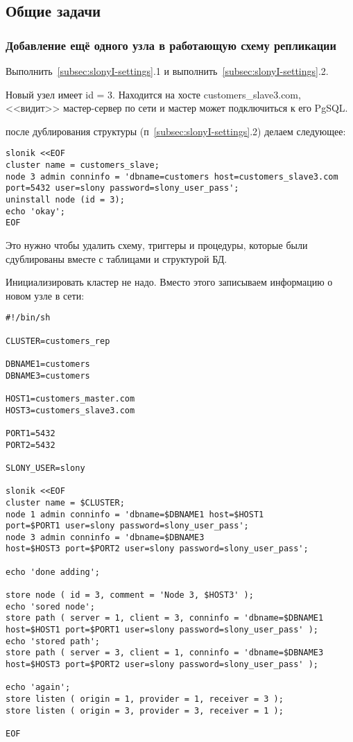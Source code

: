 \subsection{Общие задачи}
\subsubsection{Добавление ещё одного узла в работающую схему репликации}
Выполнить~\ref{subsec:slonyI-settings}.1 и выполнить~\ref{subsec:slonyI-settings}.2.

Новый узел имеет id = 3. Находится на хосте customers\_slave3.com, <<видит>> мастер-сервер по сети и
мастер может подключиться к его PgSQL.

после дублирования структуры (п~\ref{subsec:slonyI-settings}.2) делаем следующее:
\begin{lstlisting}[label=lst:slony13,caption=Общие задачи]
slonik <<EOF
cluster name = customers_slave;
node 3 admin conninfo = 'dbname=customers host=customers_slave3.com
port=5432 user=slony password=slony_user_pass';
uninstall node (id = 3);
echo 'okay';
EOF
\end{lstlisting}

Это нужно чтобы удалить схему, триггеры и процедуры, которые были сдублированы вместе с таблицами и структурой БД.

Инициализировать кластер не надо. Вместо этого записываем информацию о новом узле в сети:
\begin{lstlisting}[label=lst:slony14,caption=Общие задачи]
#!/bin/sh

CLUSTER=customers_rep

DBNAME1=customers
DBNAME3=customers

HOST1=customers_master.com
HOST3=customers_slave3.com

PORT1=5432
PORT2=5432

SLONY_USER=slony

slonik <<EOF
cluster name = $CLUSTER;
node 1 admin conninfo = 'dbname=$DBNAME1 host=$HOST1
port=$PORT1 user=slony password=slony_user_pass';
node 3 admin conninfo = 'dbname=$DBNAME3
host=$HOST3 port=$PORT2 user=slony password=slony_user_pass';

echo 'done adding';

store node ( id = 3, comment = 'Node 3, $HOST3' );
echo 'sored node';
store path ( server = 1, client = 3, conninfo = 'dbname=$DBNAME1
host=$HOST1 port=$PORT1 user=slony password=slony_user_pass' );
echo 'stored path';
store path ( server = 3, client = 1, conninfo = 'dbname=$DBNAME3
host=$HOST3 port=$PORT2 user=slony password=slony_user_pass' );

echo 'again';
store listen ( origin = 1, provider = 1, receiver = 3 );
store listen ( origin = 3, provider = 3, receiver = 1 );

EOF
\end{lstlisting}

